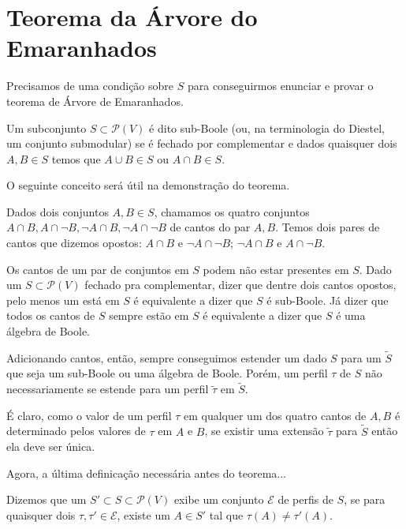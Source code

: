 \documentclass[11pt]{article}
\renewcommand{\textit}[1]{{\fakeitalic#1}}
\theoremstyle{definition}
\theoremstyle{definition}
\theoremstyle{definition}
\theoremstyle{definition}
\theoremstyle{definition}
\theoremstyle{definition}
\theoremstyle{definition}
\theoremstyle{definition}
\newtheorem*{definition*}{Definição}
\newenvironment{definicao*}{
\definecolor{shadecolor}{HTML}{defcfc}
\begin{shaded}
\begin{definition*}
}
{
\end{definition*}
\end{shaded}
}
\theoremstyle{definition}
\theoremstyle{definition}
\theoremstyle{definition}
\theoremstyle{definition}
\theoremstyle{definition}
\theoremstyle{definition}
\begin{document}
\section{Teorema da Árvore do Emaranhados}


Precisamos de uma condição sobre $S$ para conseguirmos enunciar e provar o teorema de Árvore de Emaranhados.

\begin{definicao*}
  Um subconjunto $S \subset \mathcal{P}(V)$ é dito sub-Boole (ou, na terminologia do Diestel, um conjunto submodular) se é fechado por complementar e dados quaisquer dois $A,B \in S$ temos que $A \cup B \in S$ ou $A \cap B \in S$.
\end{definicao*}

O seguinte conceito será útil na demonstração do teorema.

\begin{definicao*}
    Dados dois conjuntos $A,B \in S$, chamamos os quatro conjuntos $A \cap B, A \cap \lnot B, \lnot A \cap B, \lnot A \cap \lnot B$ de cantos do par $A,B$. Temos dois pares de cantos que dizemos \textit{opostos}: $A \cap B$ e $\lnot A \cap \lnot B$; $\lnot A \cap B$ e $A \cap \lnot B$. 
  \end{definicao*}


Os cantos de um par de conjuntos em $S$ podem não estar presentes em $S$.
Dado um $S \subset \mathcal{P}(V)$ fechado pra complementar, dizer que dentre dois cantos opostos, pelo menos um está em $S$ é equivalente a dizer que $S$ é sub-Boole. Já dizer que todos os cantos de $S$ sempre estão em $S$ é equivalente a dizer que $S$ é uma álgebra de Boole. 

Adicionando cantos, então, sempre conseguimos estender um dado $S$ para um $\tilde{S}$ que seja um sub-Boole ou uma álgebra de Boole. Porém, um perfil $\tau$ de $S$ não necessariamente se estende para um perfil $\tilde{\tau}$ em $\tilde{S}$.

É claro, como o valor de um perfil $\tau$ em qualquer um dos quatro cantos de $A,B$ é determinado pelos valores de $\tau$ em $A$ e $B$, se existir uma extensão $\tilde{\tau}$ para $\tilde{S}$ então ela deve ser única.

Agora, a última definicação necessária antes do teorema...

\begin{definicao*}
  Dizemos que um $S' \subset S \subset \mathcal{P}(V)$ exibe um conjunto $\mathcal{E}$ de perfis de $S$, se para quaisquer dois $\tau, \tau' \in \mathcal{E}$, existe um $A \in S'$ tal que $\tau(A) \neq \tau'(A)$.
\end{definicao*}
\end{document}

